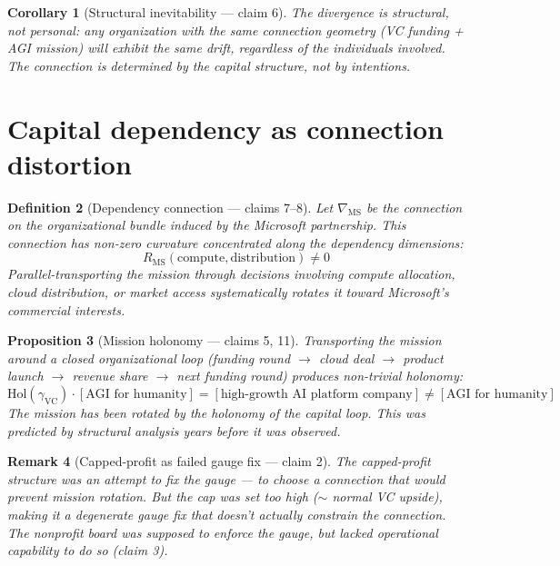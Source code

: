 \documentclass[11pt,a4paper]{article}
\newtheorem{definition}{Definition}[section]
\newtheorem{proposition}[definition]{Proposition}
\newtheorem{corollary}[definition]{Corollary}
\newtheorem{remark}[definition]{Remark}
\begin{document}
\begin{corollary}[Structural inevitability --- claim 6]
The divergence is structural, not personal: any organization with the
same connection geometry (VC funding + AGI mission) will exhibit the
same drift, regardless of the individuals involved. The connection
is determined by the capital structure, not by intentions.
\end{corollary}

\section{Capital dependency as connection distortion}
\label{sec:capital}

\begin{definition}[Dependency connection --- claims 7--8]
\label{def:dependency}
Let $\nabla_{\text{MS}}$ be the connection on the organizational bundle
induced by the Microsoft partnership. This connection has non-zero
curvature concentrated along the dependency dimensions:
\[
  R_{\text{MS}}(\text{compute}, \text{distribution}) \neq 0
\]
Parallel-transporting the mission through decisions involving compute
allocation, cloud distribution, or market access systematically rotates
it toward Microsoft's commercial interests.
\end{definition}

\begin{proposition}[Mission holonomy --- claims 5, 11]
\label{prop:holonomy}
Transporting the mission around a closed organizational loop
(funding round $\to$ cloud deal $\to$ product launch $\to$ revenue share
$\to$ next funding round) produces non-trivial holonomy:
\[
  \mathrm{Hol}(\gamma_{\text{VC}}) \cdot [\text{AGI for humanity}]
  = [\text{high-growth AI platform company}]
  \neq [\text{AGI for humanity}]
\]
The mission has been rotated by the holonomy of the capital loop. This
was predicted by structural analysis years before it was observed.
\end{proposition}

\begin{remark}[Capped-profit as failed gauge fix --- claim 2]
The capped-profit structure was an attempt to fix the gauge --- to choose
a connection that would prevent mission rotation. But the cap was set too
high ($\sim$ normal VC upside), making it a degenerate gauge fix that
doesn't actually constrain the connection. The nonprofit board was
supposed to enforce the gauge, but lacked operational capability to
do so (claim 3).
\end{remark}
\end{document}
